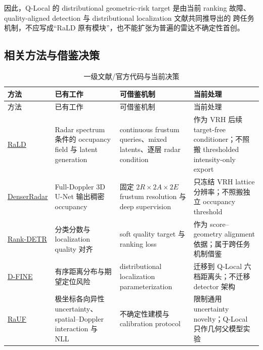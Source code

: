 \documentclass[11pt,a4paper,fontset=none]{ctexart}
\begin{document}
因此，Q-Local 的 distributional geometric-risk target 是由当前 ranking
故障、quality-aligned detection 与 distributional localization 文献共同推导出的
跨任务机制，不应写成“RaLD 原有模块”，也不能扩张为普遍的雷达不确定性首创。

\subsection{相关方法与借鉴决策}

\begin{longtable}{p{2.7cm} p{4.1cm} p{4.4cm} p{3.5cm}}
\caption{一级文献/官方代码与当前决策}\\
\toprule
方法 & 已有工作 & 可借鉴机制 & 当前处理 \\
\midrule
\endfirsthead
\toprule
方法 & 已有工作 & 可借鉴机制 & 当前处理 \\
\midrule
\endhead
\href{https://ojs.aaai.org/index.php/AAAI/article/view/38946}{RaLD} &
Radar spectrum 条件的 occupancy field 与 latent generation &
continuous frustum queries、mixed latents、逐层 radar condition &
作为 VRH 后续 target-free conditioner；不照搬 thresholded intensity-only export \\

\href{https://arxiv.org/abs/2405.05131}{DenserRadar} &
Full-Doppler 3D U-Net 输出稠密 occupancy &
固定 $2R\times2A\times2E$ frustum resolution 与 deep supervision &
只冻结 VRH lattice 分辨率；不照搬独立 occupancy threshold \\

\href{https://proceedings.neurips.cc/paper_files/paper/2023/file/34074479ee2186a9f236b8fd03635372-Paper-Conference.pdf}{Rank-DETR} &
分类分数与 localization quality 对齐 &
soft quality target 与 ranking loss &
作为 score--geometry alignment 依据；属于跨任务机制借鉴 \\

\href{https://proceedings.iclr.cc/paper_files/paper/2025/hash/6cf58a87e3097e7d1f9be3e8693a93de-Abstract-Conference.html}{D-FINE} &
有序距离分布与期望定位风险 &
distributional localization parameterization &
迁移到 Q-Local 六档距离头；不迁移 detector 架构 \\

\href{https://openaccess.thecvf.com/content/CVPR2026/papers/Wang_RaUF_Learning_the_Spatial_Uncertainty_Field_of_Radar_CVPR_2026_paper.pdf}{RaUF} &
极坐标各向异性 uncertainty、spatial--Doppler interaction 与 NLL &
不确定性建模与 calibration protocol &
限制通用 uncertainty novelty；Q-Local 只作几何父模型实验 \\


\end{longtable}
\end{document}
